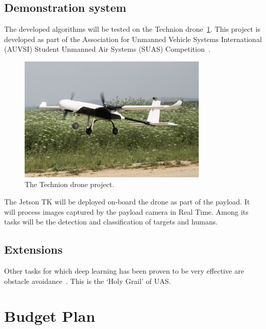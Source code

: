 \documentclass{article} %
\begin{document}
\subsection{Demonstration system}

The developed algorithms will be tested on the Technion drone~\cref{fig:drone}. This
project is developed as part of the Association for Unmanned Vehicle Systems International
(AUVSI) Student Unmanned Air Systems (SUAS) Competition~\cite{AUVSI_competition}.
\begin{figure}[h]
	\centering
	\includegraphics[width=0.8\textwidth]{drone}
	\caption{The Technion drone project.}
	\label{fig:drone}
\end{figure}
The Jetson TK will be deployed on-board the drone as part of the payload. It will process
images captured by the payload camera in Real Time. Among its tasks will be the
detection and classification of targets and humans.

\subsection{Extensions}

Other tasks for which deep learning has been proven to be very effective are
obstacle avoidance~\cite{hadsell2009learning, eigen2014depth, ross2013learning}.
This is the `Holy Grail' of UAS. 

\section{Budget Plan}
\end{document}
